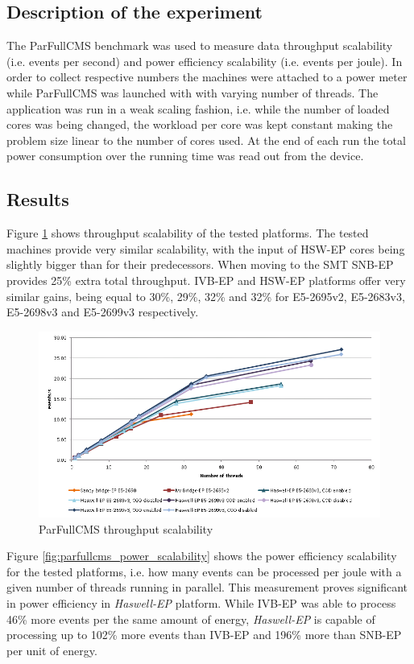 \documentclass[a4paper]{jpconf}
\begin{document}
\subsection{Description of the experiment}
The ParFullCMS benchmark was used to measure data throughput scalability (i.e. events per second) and power efficiency scalability (i.e. events per joule). In order to collect respective numbers the machines were attached to a power meter while ParFullCMS was launched with with varying number of threads. The application was run in a weak scaling fashion, i.e. while the number of loaded cores was being changed, the workload per core was kept constant making the problem size linear to the number of cores used. At the end of each run the total power consumption over the running time was read out from the device.

\subsection{Results}
Figure \ref{fig:parfullcms_throughput_scalability} shows throughput scalability of the tested platforms. The tested machines provide very similar scalability, with the input of HSW-EP cores being slightly bigger than for their predecessors. When moving to the SMT SNB-EP provides 25\% extra total throughput. IVB-EP and HSW-EP platforms offer very similar gains, being equal to 30\%, 29\%, 32\% and 32\% for E5-2695v2, E5-2683v3, E5-2698v3 and E5-2699v3 respectively. 
\begin{figure}[ht!]
\centering
  \includegraphics[width=\textwidth]{parfullcms_throughput}
  \caption{ParFullCMS throughput scalability}
  \label{fig:parfullcms_throughput_scalability}
\end{figure}
Figure \ref{fig:parfullcms_power_scalability} shows the power efficiency scalability for the tested platforms, i.e. how many events can be processed per joule with a given number of threads running in parallel. This measurement proves significant in power efficiency in \textit{Haswell-EP} platform. While IVB-EP was able to process 46\% more events per the same amount of energy, \textit{Haswell-EP} is capable of processing up to 102\% more events than IVB-EP and 196\% more than SNB-EP per unit of energy.
\end{document}
